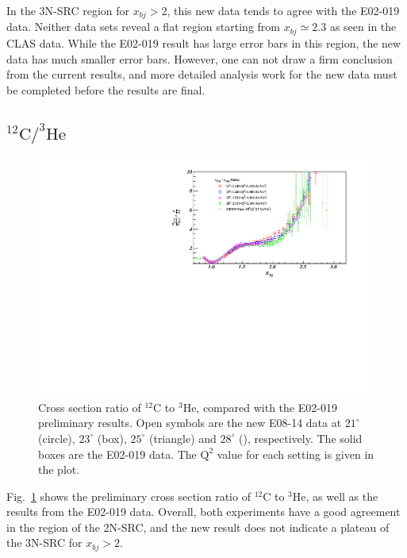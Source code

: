   In the 3N-SRC region for $x_{bj}>2$, this new data tends to agree with the E02-019 data. Neither data sets reveal a flat region starting from $x_{bj}\simeq 2.3$ as seen in the CLAS data. While the E02-019 result has large error bars in this region, the new data has much smaller error bars. However, one can not draw a firm conclusion from the current results, and more detailed analysis work for the new data must be completed before the results are final.
 
 \subsection{$\mathrm{^{12}C/^{3}He}$}
 \begin{figure}[!ht]
  \begin{center}
    \includegraphics[type=pdf,ext=.pdf,read=.pdf,width=1.\textwidth]{./figures/xs/C12_He3_XS_Ratio_Zoom}
    \caption[Cross section ratio of $\mathrm{^{12}C}$ to $\mathrm{^{3}He}$]{\footnotesize{Cross section ratio of $\mathrm{^{12}C}$ to $\mathrm{^{3}He}$, compared with the E02-019 preliminary results. Open symbols are the new E08-14 data at $21^{\circ}$ (circle), $23^{\circ}$ (box), $25^{\circ}$ (triangle) and $28^{\circ}$ (), respectively. The solid boxes are the E02-019 data. The $\mathrm{Q^{2}}$ value for each setting is given in the plot.}}
    \label{ratio_c12_he3}
  \end{center}
\end{figure}
Fig.~\ref{ratio_c12_he3} shows the preliminary cross section ratio of $\mathrm{^{12}C}$ to $\mathrm{^{3}He}$, as well as the results from the E02-019 data. Overall, both experiments have a good agreement in the region of the 2N-SRC, and the new result does not indicate a plateau of the 3N-SRC for $x_{bj}>2$.

